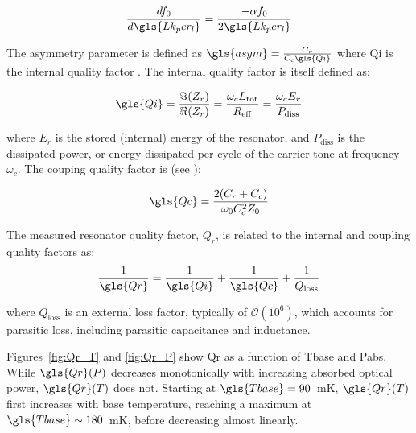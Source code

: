 \begin{equation}
 \frac{df_{0}}{d\gls{Lk_per_l}} = \frac{-\alpha f_{0}}{2\gls{Lk_per_l}}
\end{equation}

The asymmetry parameter is defined as $\gls{asym} = \frac{C_{r}}{C_{c}\gls{Qi}}$
where \gls{Qi} is the internal quality factor \citep{mauskopf2018transition}. The internal quality factor is itself defined as:

\begin{equation}\label{eq:Qi}
  \gls{Qi} = \frac{\Im(Z_{r})}{\Re(Z_{r})} = \frac{\omega_{c}L_{\mathrm{tot}}}{R_{\mathrm{eff}}} = \frac{\omega_{c} E_{r}}{P_{\mathrm{diss}}}
\end{equation}

where $E_{r}$ is the stored (internal) energy of the resonator, and $P_{\mathrm{diss}}$ is the dissipated power, or energy dissipated per cycle of the carrier tone at frequency $\omega_{c}$. The couping quality factor is (see \citet{barry2014development}):

\begin{equation} \label{eq:Qc}
  \gls{Qc} = \frac{2(C_{r} + C_{c})}{\omega_{0}C_{c}^{2}Z_{0}}
\end{equation}

The measured resonator quality factor, $Q_{r}$, is related to the internal and coupling quality factors as:
\begin{equation}
  \frac{1}{\gls{Qr}} = \frac{1}{\gls{Qi}} + \frac{1}{\gls{Qc}} + \frac{1}{Q_{\mathrm{loss}}}
\end{equation}

where $Q_{\mathrm{loss}}$ is an external loss factor, typically of $\mathcal{O}(10^{6})$, which accounts for parasitic loss, including parasitic capacitance and inductance.

Figures~\ref{fig:Qr_T} and \ref{fig:Qr_P} show \gls{Qr} as a function of \gls{Tbase} and \gls{Pabs}. While $\gls{Qr}(P)$ decreases monotonically with increasing absorbed optical power, $\gls{Qr}(T)$ does not. Starting at $\gls{Tbase} = 90$~mK, $\gls{Qr}(T)$ first increases with base temperature, reaching a maximum at $\gls{Tbase} \sim 180$~mK, before decreasing almost linearly.

